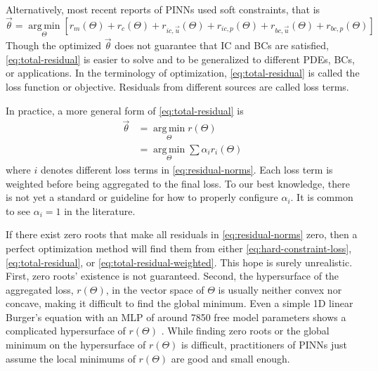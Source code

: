 Alternatively, most recent reports of PINNs used soft constraints, that is
\begin{equation}\label{eq:total-residual}
    \vec{\theta} = \operatorname*{arg\,min}\limits_{\Theta} \left[
        r_m(\Theta) + r_c(\Theta) + r_{ic,\vec{u}}(\Theta) + r_{ic,p}(\Theta) + r_{bc,\vec{u}}(\Theta) + r_{bc,p}(\Theta)
    \right]
\end{equation}
Though the optimized $\vec{\theta}$ does not guarantee that IC and BCs are satisfied, \eqref{eq:total-residual} is easier to solve and to be generalized to different PDEs, BCs, or applications.
In the terminology of optimization, \eqref{eq:total-residual} is called the loss function or objective.
Residuals from different sources are called loss terms.

In practice, a more general form of \eqref{eq:total-residual} is
\begin{equation}\label{eq:total-residual-weighted}
    \begin{aligned}
        \vec{\theta}
        &=
        \operatorname*{arg\,min}\limits_{\Theta} r(\Theta)  \\
        &=
        \operatorname*{arg\,min}\limits_{\Theta} \sum \alpha_i r_i(\Theta)
    \end{aligned}
\end{equation}
where $i$ denotes different loss terms in \eqref{eq:residual-norms}.
Each loss term is weighted before being aggregated to the final loss.
To our best knowledge, there is not yet a standard or guideline for how to properly configure $\alpha_i$.
It is common to see $\alpha_i=1$ in the literature.

If there exist zero roots that make all residuals in \eqref{eq:residual-norms} zero, then a perfect optimization method will find them from either \eqref{eq:hard-constraint-loss}, \eqref{eq:total-residual}, or \eqref{eq:total-residual-weighted}.
This hope is surely unrealistic.
First, zero roots' existence is not guaranteed.
Second, the hypersurface of the aggregated loss, $r(\Theta)$, in the vector space of $\Theta$ is usually neither convex nor concave, making it difficult to find the global minimum.
Even a simple 1D linear Burger's equation with an MLP of around \num{7850} free model parameters shows a complicated hypersurface of $r(\Theta)$ \cite{krishnapriyan_characterizing_2021}.
While finding zero roots or the global minimum on the hypersurface of $r(\Theta)$ is difficult, practitioners of PINNs just assume the local minimums of $r(\Theta)$ are good and small enough.

